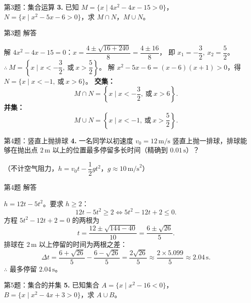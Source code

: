 \documentclass[10pt,aspectratio=169,serif]{beamer}
\begin{document}
\begin{frame}[t]{第3题：集合运算}
\textbf{3.} 已知 $M=\{x\mid 4x^{2}-4x-15>0\}$，$N=\{x\mid x^{2}-5x-6>0\}$，求 $M\cap N$，$M\cup N$。
\end{frame}

\begin{frame}[t]{第3题 解答}
\begin{tcolorbox}[colback=orange!10,colframe=orange,title=\textbf{解}]
解 $4x^{2}-4x-15=0$：$x=\dfrac{4\pm\sqrt{16+240}}{8}=\dfrac{4\pm 16}{8}$，
即 $x_{1}=-\dfrac{3}{2},\ x_{2}=\dfrac{5}{2}$。
$\therefore\ M=\left\{x\mid x<-\dfrac{3}{2},\ \text{或}\ x>\dfrac{5}{2}\right\}$。
\vspace{0.3em}
解 $x^{2}-5x-6=(x-6)(x+1)>0$，得 $N=\{x\mid x<-1,\ \text{或}\ x>6\}$。
\vspace{0.5em}
\textbf{交集：}
\[
M\cap N=\left\{x\mid x<-\frac{3}{2},\ \text{或}\ x>6\right\}.
\]
\textbf{并集：}
\[
M\cup N=\left\{x\mid x<-1,\ \text{或}\ x>\frac{5}{2}\right\}.
\]
\end{tcolorbox}
\end{frame}

\begin{frame}[t]{第4题：竖直上抛排球}
\textbf{4.} 一名同学以初速度 $v_{0}=12\,\text{m/s}$ 竖直上抛一排球，排球能够在抛出点 $2\,\text{m}$ 以上的位置最多停留多长时间（精确到 $0.01\,\text{s}$）？

\vspace{0.5em}
\small（不计空气阻力，$h=v_{0}t-\dfrac{1}{2}gt^{2}$，$g\approx 10\,\text{m/s}^{2}$）
\end{frame}

\begin{frame}[t]{第4题 解答}
\begin{tcolorbox}[colback=orange!10,colframe=orange,title=\textbf{解}]
$h=12t-5t^{2}$。要求 $h\ge 2$：
\[
12t-5t^{2}\ge 2
\Longleftrightarrow 5t^{2}-12t+2\le 0.
\]
方程 $5t^{2}-12t+2=0$ 的两根为
\[
t=\frac{12\pm\sqrt{144-40}}{10}=\frac{6\pm\sqrt{26}}{5}.
\]
排球在 $2\,\text{m}$ 以上停留的时间为两根之差：
\[
\Delta t=\frac{6+\sqrt{26}}{5}-\frac{6-\sqrt{26}}{5}
=\frac{2\sqrt{26}}{5}\approx \frac{2\times 5.099}{5}\approx 2.04\,\text{s}.
\]
$\therefore$ 最多停留 \alert{$2.04\,\text{s}$}。
\end{tcolorbox}
\end{frame}

\begin{frame}[t]{第5题：集合的并集}
\textbf{5.} 已知集合 $A=\{x\mid x^{2}-16<0\}$，$B=\{x\mid x^{2}-4x+3>0\}$，求 $A\cup B$。
\end{frame}
\end{document}
